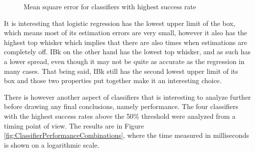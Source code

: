 \documentclass{sig-alternate}
\begin{document}
\begin{figure}[htpb]
\begin{center}

	\caption{Mean square error for classifiers with highest success rate}
	\label{fig:ClassifierMSQE}
\end{center}
\end{figure}

It is interesting that logistic regression has the lowest upper limit of the box, which means most of its estimation errors are very small, however it also has the highest top whisker which implies that there are also times when estimations are completely off. IBk on the other hand has the lowest top whisker, and as such has a lower spread, even though it may not be quite as accurate as the regression in many cases. That being said, IBk still has the second lowest upper limit of its box and those two properties put together make it an interesting choice.

There is however another aspect of classifiers that is interesting to analyze further before drawing any final conclusions, namely performance. The four classifiers with the highest success rates above the 50\% threshold were analyzed from a timing point of view. The results are in Figure \ref{fig:ClassifierPerformanceCombinations}, where the time measured in milliseconds is shown on a logarithmic scale.
\end{document}
